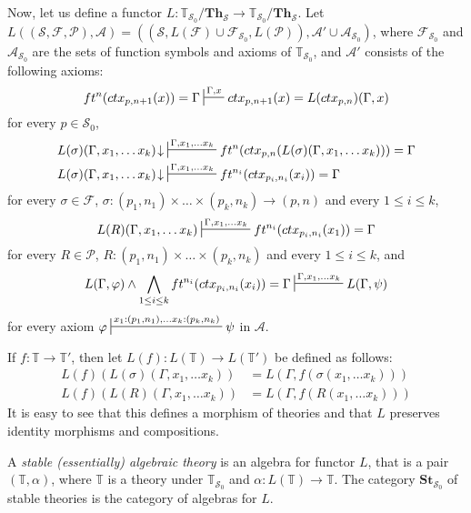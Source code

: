 \documentclass[reqno]{amsart}
\theoremstyle{definition}
\theoremstyle{remark}
\newcommand{\cat}[1]{\mathbf{#1}}
\newcommand{\Th}{\cat{Th}}
\newcommand{\St}{\cat{St}}
\numberwithin{figure}{section}
\begin{document}
Now, let us define a functor $L : \mathbb{T}_{\mathcal{S}_0}/\Th_\mathcal{S} \to \mathbb{T}_{\mathcal{S}_0}/\Th_\mathcal{S}$.
Let $L((\mathcal{S}, \mathcal{F}, \mathcal{P}), \mathcal{A}) = ((\mathcal{S}, L(\mathcal{F}) \cup \mathcal{F}_{\mathcal{S}_0}, L(\mathcal{P})), \mathcal{A}' \cup \mathcal{A}_{\mathcal{S}_0})$,
where $\mathcal{F}_{\mathcal{S}_0}$ and $\mathcal{A}_{\mathcal{S}_0}$ are the sets of function symbols and axioms of $\mathbb{T}_{\mathcal{S}_0}$, and $\mathcal{A}'$ consists of the following axioms:
\[ ft^n(ctx_{p,n+1}(x)) = \Gamma \sststile{}{\Gamma,x} ctx_{p,n+1}(x) = L(ctx_{p,n})(\Gamma,x) \]
for every $p \in \mathcal{S}_0$,
\begin{align*}
L(\sigma)(\Gamma, x_1, \ldots x_k)\!\downarrow & \sststile{}{\Gamma, x_1, \ldots x_k} ft^n(ctx_{p,n}(L(\sigma)(\Gamma, x_1, \ldots x_k))) = \Gamma \\
L(\sigma)(\Gamma, x_1, \ldots x_k)\!\downarrow & \sststile{}{\Gamma, x_1, \ldots x_k} ft^{n_i}(ctx_{p_i,n_i}(x_i)) = \Gamma
\end{align*}
for every $\sigma \in \mathcal{F}$, $\sigma : (p_1,n_1) \times \ldots \times (p_k,n_k) \to (p,n)$ and every $1 \leq i \leq k$,
\[ L(R)(\Gamma, x_1, \ldots x_k) \sststile{}{\Gamma, x_1, \ldots x_k} ft^{n_i}(ctx_{p_i,n_i}(x_1)) = \Gamma \]
for every $R \in \mathcal{P}$, $R : (p_1,n_1) \times \ldots \times (p_k,n_k)$ and every $1 \leq i \leq k$, and
\[ L(\Gamma,\varphi) \land \bigwedge_{1 \leq i \leq k} ft^{n_i}(ctx_{p_i,n_i}(x_i)) = \Gamma \sststile{}{\Gamma, x_1, \ldots x_k} L(\Gamma,\psi) \]
for every axiom $\varphi \sststile{}{x_1 : (p_1,n_1), \ldots x_k : (p_k,n_k)} \psi$ in $\mathcal{A}$.

If $f : \mathbb{T} \to \mathbb{T}'$, then let $L(f) : L(\mathbb{T}) \to L(\mathbb{T}')$ be defined as follows:
\begin{align*}
L(f)(L(\sigma)(\Gamma, x_1, \ldots x_k)) & = L(\Gamma, f(\sigma(x_1, \ldots x_k))) \\
L(f)(L(R)(\Gamma, x_1, \ldots x_k)) & = L(\Gamma, f(R(x_1, \ldots x_k)))
\end{align*}
It is easy to see that this defines a morphism of theories and that $L$ preserves identity morphisms and compositions.

\begin{defn}
A \emph{stable (essentially) algebraic theory} is an algebra for functor $L$,
that is a pair $(\mathbb{T},\alpha)$, where $\mathbb{T}$ is a theory under $\mathbb{T}_{\mathcal{S}_0}$ and $\alpha : L(\mathbb{T}) \to \mathbb{T}$.
The category $\St_{\mathcal{S}_0}$ of stable theories is the category of algebras for $L$.
\end{defn}
\end{document}
